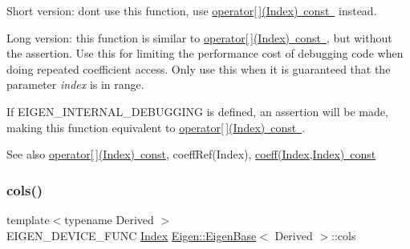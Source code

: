 Short version\+: don\textquotesingle{}t use this function, use \mbox{\hyperlink{class_eigen_1_1_dense_coeffs_base_3_01_derived_00_01_read_only_accessors_01_4_ad26422dfa7b2bf859d4304663c36de10}{operator\mbox{[}$\,$\mbox{]}(\+Index) const }} instead.

Long version\+: this function is similar to \mbox{\hyperlink{class_eigen_1_1_dense_coeffs_base_3_01_derived_00_01_read_only_accessors_01_4_ad26422dfa7b2bf859d4304663c36de10}{operator\mbox{[}$\,$\mbox{]}(\+Index) const }}, but without the assertion. Use this for limiting the performance cost of debugging code when doing repeated coefficient access. Only use this when it is guaranteed that the parameter {\itshape index} is in range.

If E\+I\+G\+E\+N\+\_\+\+I\+N\+T\+E\+R\+N\+A\+L\+\_\+\+D\+E\+B\+U\+G\+G\+I\+NG is defined, an assertion will be made, making this function equivalent to \mbox{\hyperlink{class_eigen_1_1_dense_coeffs_base_3_01_derived_00_01_read_only_accessors_01_4_ad26422dfa7b2bf859d4304663c36de10}{operator\mbox{[}$\,$\mbox{]}(\+Index) const }}.

\begin{DoxySeeAlso}{See also}
\mbox{\hyperlink{class_eigen_1_1_dense_coeffs_base_3_01_derived_00_01_read_only_accessors_01_4_ad26422dfa7b2bf859d4304663c36de10}{operator\mbox{[}$\,$\mbox{]}(\+Index) const}}, coeff\+Ref(\+Index), \mbox{\hyperlink{class_eigen_1_1_dense_coeffs_base_3_01_derived_00_01_read_only_accessors_01_4_ad41647ef695f9a5a58a9a0f50e2ae064}{coeff(\+Index,\+Index) const}} 
\end{DoxySeeAlso}
\mbox{\label{class_eigen_1_1_dense_coeffs_base_3_01_derived_00_01_read_only_accessors_01_4_a7b0b45c7351847696c911ce8aa2abbdb}} 
\subsubsection{\texorpdfstring{cols()}{cols()}}
{\footnotesize\ttfamily template$<$typename Derived $>$ \\
E\+I\+G\+E\+N\+\_\+\+D\+E\+V\+I\+C\+E\+\_\+\+F\+U\+NC \mbox{\hyperlink{struct_eigen_1_1_eigen_base_a554f30542cc2316add4b1ea0a492ff02}{Index}} \mbox{\hyperlink{struct_eigen_1_1_eigen_base}{Eigen\+::\+Eigen\+Base}}$<$ Derived $>$\+::cols\hspace{0.3cm}{\ttfamily [inline]}}

